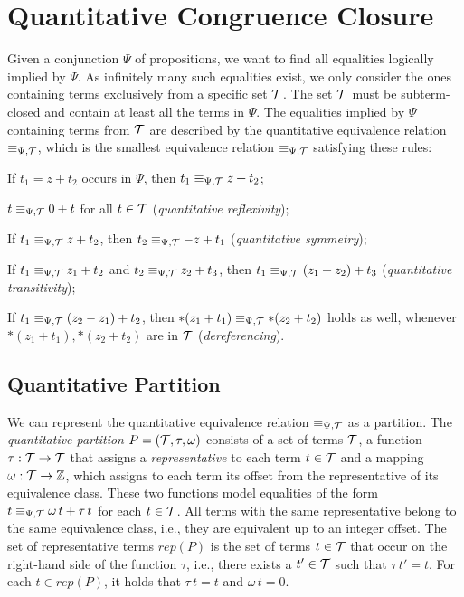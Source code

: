 \section{Quantitative Congruence Closure}\label{chapter:qcc}

Given a conjunction $\Psi$ of propositions, we want to find all equalities logically implied by $\Psi$.
As infinitely many such equalities exist, we only consider the ones containing terms exclusively from a specific set $\mathcal{T}$.
The set $\mathcal{T}$ must be subterm-closed and contain at least all the terms in $\Psi$.
The equalities implied by $\Psi$ containing terms from $\mathcal{T}$ are described by the quantitative equivalence relation $\equiv_{\Psi,\mathcal{T}}$, which is the smallest equivalence relation $\equiv_{\Psi,\mathcal{T}}$ satisfying these rules:
\begin{enumerate}[label={[E\arabic*]}, ref={[E\arabic*]}]
  \setcounter{enumi}{-1}
  \item\label{item:persistence} If $t_1 = z+t_2$ occurs in $\Psi$, then $t_1 \equiv_{\Psi,\mathcal{T}} z+t_2$;
  \item\label{item:quantitative-reflexivity} $t \equiv_{\Psi,\mathcal{T}} 0+t$ for all $t\in\mathcal{T}$ (\emph{quantitative reflexivity});
  \item\label{item:quantitative-symmetry} If $t_1 \equiv_{\Psi,\mathcal{T}} z+t_2$, then $t_2 \equiv_{\Psi,\mathcal{T}} -z+t_1$ (\emph{quantitative symmetry});
  \item\label{item:quantitative-transitivity} If $t_1 \equiv_{\Psi,\mathcal{T}} z_1+t_2$ and $t_2 \equiv_{\Psi,\mathcal{T}} z_2 + t_3$,
  then $t_1 \equiv_{\Psi,\mathcal{T}} (z_1+z_2)+t_3$ (\emph{quantitative transitivity});
  \item\label{item:dereferencing} If $t_1 \equiv_{\Psi,\mathcal{T}} (z_2 - z_1) + t_2$, then $*(z_1 + t_1) \equiv_{\Psi,\mathcal{T}} *(z_2 + t_2)$ holds as well, whenever $*(z_1 + t_1),  *(z_2 + t_2)$ are in $\mathcal{T}$ (\emph{dereferencing}).
\end{enumerate}

\subsection{Quantitative Partition}\label{subsection:quantitative-union-find}

We can represent the quantitative equivalence relation $\equiv_{\Psi,\mathcal{T}}$ as a partition.
The \emph{quantitative partition} $P = (\mathcal{T}, \tau, \omega)$ consists of a set of terms $\mathcal{T}$,
a function $\tau : \mathcal{T} \rightarrow \mathcal{T}$ that assigns a \emph{representative} to each term $t \in \mathcal{T}$ and a mapping $\omega : \mathcal{T} \rightarrow \mathbb{Z}$,
which assigns to each term its offset from the representative of its equivalence class.
These two functions model equalities of the form $t \equiv_{\Psi,\mathcal{T}} \omega\,t + \tau\,t$ for each $t \in \mathcal{T}$.
All terms with the same representative belong to the same equivalence class, i.e., they are equivalent up to an integer offset.
The set of representative terms $rep(P)$ is the set of terms $t \in \mathcal{T}$ that occur on the right-hand side of the function $\tau$, i.e., there exists a $t'\in \mathcal{T}$ such that $\tau\,t' = t$.
For each $t\in rep(P)$, it holds that $\tau\,t=t$ and $\omega\,t = 0$.

